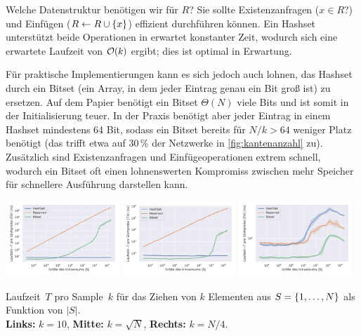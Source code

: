 Welche Datenstruktur benötigen wir für $R$? Sie sollte Existenzanfragen ($x \in R$?) und Einfügen ($R \gets R \cup \left\{x\right\}$) effizient durchführen können.
Ein Hashset unterstützt beide Operationen in erwartet konstanter Zeit, wodurch sich eine erwartete Laufzeit von $\mathcal{O}\!\left(k\right)$ ergibt; dies ist optimal in Erwartung.

Für praktische Implementierungen kann es sich jedoch auch lohnen, das Hashset durch ein Bitset (\dh ein Array, in dem jeder Eintrag genau ein Bit groß ist) zu ersetzen.
Auf dem Papier benötigt ein Bitset $\Theta(N)$ viele Bits und ist somit in der Initialisierung teuer.
In der Praxis benötigt aber jeder Eintrag in einem Hashset mindestens 64 Bit, sodass ein Bitset bereits für $N / k > 64$ weniger Platz benötigt (das trifft etwa auf 30\,\% der Netzwerke in \cref{fig:kantenanzahl} zu).
Zusätzlich sind Existenzanfragen und Einfügeoperationen extrem schnell, wodurch ein Bitset oft einen lohnenswerten Kompromiss zwischen mehr Speicher für schnellere Ausführung darstellen kann.

\begin{widefigure}
    \includegraphics[width=0.32\textwidth]{data/gnm_scale0.pdf}\hfill
    \includegraphics[width=0.32\textwidth]{data/gnm_scale1.pdf}\hfill
    \includegraphics[width=0.32\textwidth]{data/gnm_scale2.pdf}

    \caption{
        Laufzeit~$T$ pro Sample~$k$ für das Ziehen von $k$ Elementen aus $S = \left\{1, \ldots, N\right\}$ als Funktion von $|S|$.\\
        \textbf{Links:} $k=10$, \textbf{Mitte: } $k = \sqrt{N}$, \textbf{Rechts: } $k = N / 4$.
    }
    \label{fig:benchmark_gnm_scale}
\end{widefigure}

